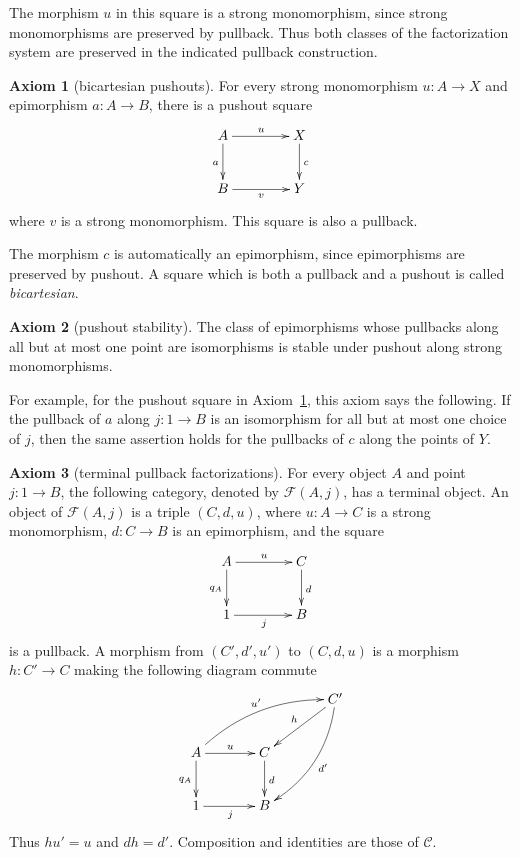 \documentclass[11pt,a4paper]{article}
\theoremstyle{plain}
\theoremstyle{definition}
\newtheorem{axiom}{Axiom}
\theoremstyle{remark}
\newcommand{\C}{\mathcal C}
\newcommand{\one}{1}
\newcommand{\Fill}{\mathcal F}
\begin{document}
The morphism $u$ in this square is a strong monomorphism, since
strong monomorphisms are preserved by pullback. Thus both
classes of the factorization system are preserved in the
indicated pullback construction.

\begin{axiom}[bicartesian pushouts]\label{ax:Dpush}
For every strong monomorphism $u:A\to X$ and epimorphism
$a:A\to B$, there is a pushout square
\[
\xymatrix@C=4em@R=2.5em{
A\ar[r]^u\ar[d]_a&X\ar[d]^c\\
B\ar[r]_v&Y
}
\]
where $v$ is a strong monomorphism. This square is also a pullback.
\end{axiom}

The morphism $c$ is automatically an epimorphism, since
epimorphisms are preserved by pushout. A square which is both
a pullback and a pushout is called \emph{bicartesian}.

\begin{axiom}[pushout stability]\label{ax:pointpushout}
The class of epimorphisms whose pullbacks along all but at most one
point are isomorphisms is stable under pushout along strong
monomorphisms.
\end{axiom}

For example, for the pushout square in Axiom~\ref{ax:Dpush},
this axiom says the following. If the pullback of $a$ along
$j:\one\to B$ is an isomorphism for all but at most one choice
of $j$, then the same assertion holds for the pullbacks of $c$
along the points of $Y$.

\begin{axiom}[terminal pullback factorizations]\label{ax:U}
For every object $A$ and point $j:\one\to B$, the following
category, denoted by $\Fill(A,j)$, has a terminal object. An
object of $\Fill(A,j)$ is a triple $(C,d,u)$, where
$u:A\to C$ is a strong monomorphism, $d:C\to B$ is an
epimorphism, and the square
\begin{equation}\label{eq:fillsquare}
\vcenter{\xymatrix@C=4em@R=2.5em{
A\ar[r]^u\ar[d]_{q_A}&C\ar[d]^d\\
 \one\ar[r]_j&B
}}
\end{equation}
is a pullback. A morphism from $(C',d',u')$ to $(C,d,u)$ is
a morphism $h:C'\to C$ making the following diagram commute
\[
\xymatrix@C=3.5em@R=2.5em{
&&C'\ar[dl]_h\ar@/^1pc/[ddl]^{d'}\\
A\ar[r]^u\ar[d]_{q_A}\ar@/^1pc/[urr]^{u'}&C\ar[d]^d&\\
\one\ar[r]_j&B&
}
\]
Thus $hu'=u$ and $dh=d'$.
Composition and identities are those of $\C$.
\end{axiom}
\end{document}
